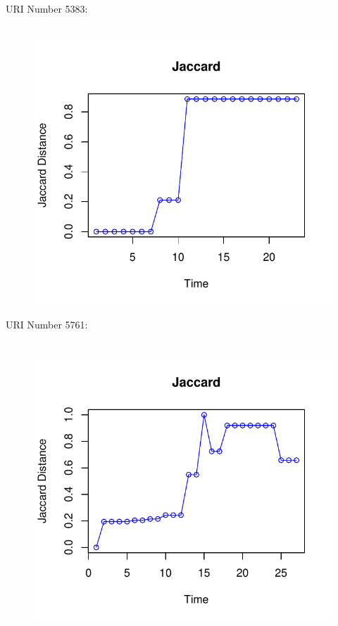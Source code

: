 \documentclass[12pt]{article}
\begin{document}
URI Number 5383:\\
\begin{figure}[H]
    \centering
    \includegraphics[scale=0.7]{5383.pdf}
\end{figure}

URI Number 5761:\\
\begin{figure}[H]
    \centering
    \includegraphics[scale=0.7]{5761.pdf}
\end{figure}
\end{document}
